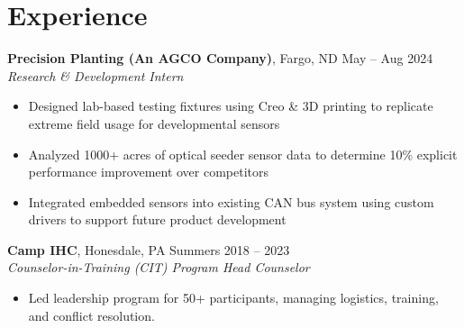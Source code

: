 \documentclass[10pt]{article}
\begin{document}
\section*{Experience}
\textbf{Precision Planting (An AGCO Company)}, Fargo, ND \hfill May -- Aug 2024 \\
\textit{Research \& Development Intern}
\begin{itemize}
  \item Designed lab-based testing fixtures using Creo \& 3D printing to replicate extreme field usage for developmental sensors
  \item Analyzed 1000+ acres of optical seeder sensor data to determine 10\% explicit performance improvement over competitors
  \item Integrated embedded sensors into existing CAN bus system using custom drivers to support future product development
\end{itemize}
\vspace{0.5em}
\textbf{Camp IHC}, Honesdale, PA \hfill Summers 2018 -- 2023 \\
\textit{Counselor-in-Training (CIT) Program Head Counselor}
\begin{itemize}
  \item Led leadership program for 50+ participants, managing logistics, training, and conflict resolution.
\end{itemize}
\end{document}
